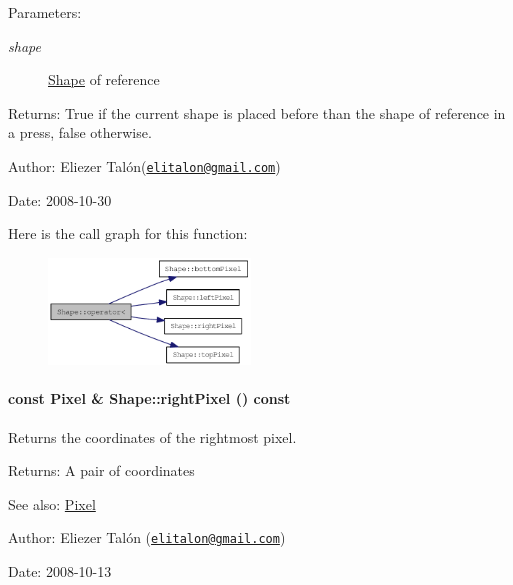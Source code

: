 \begin{Desc}
\item[Parameters:]
\begin{description}
\item[{\em shape}]\hyperlink{class_shape}{Shape} of reference\end{description}
\end{Desc}
\begin{Desc}
\item[Returns:]True if the current shape is placed before than the shape of reference in a press, false otherwise.\end{Desc}
\begin{Desc}
\item[Author:]Eliezer Talón(\href{mailto:elitalon@gmail.com}{\tt elitalon@gmail.com}) \end{Desc}
\begin{Desc}
\item[Date:]2008-10-30 \end{Desc}


Here is the call graph for this function:\nopagebreak
\begin{figure}[H]
\begin{center}
\leavevmode
\includegraphics[width=152pt]{class_shape_183a6bc428172ced8122ffb68d0f04ef_cgraph}
\end{center}
\end{figure}
\hypertarget{class_shape_c265e43fa90ee2ab7c9cd3a3d1e96d82}{
\paragraph[{rightPixel}]{\setlength{\rightskip}{0pt plus 5cm}const {\bf Pixel} \& Shape::rightPixel () const}\hfill}
\label{class_shape_c265e43fa90ee2ab7c9cd3a3d1e96d82}


Returns the coordinates of the rightmost pixel. 

\begin{Desc}
\item[Returns:]A pair of coordinates\end{Desc}
\begin{Desc}
\item[See also:]\hyperlink{_shape_8hpp_535e59456e3e633842529cfa8ea103c4}{Pixel}\end{Desc}
\begin{Desc}
\item[Author:]Eliezer Talón (\href{mailto:elitalon@gmail.com}{\tt elitalon@gmail.com}) \end{Desc}
\begin{Desc}
\item[Date:]2008-10-13 \end{Desc}



